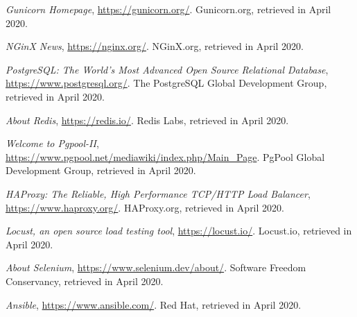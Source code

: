 \documentclass[12pt]{article}
\begin{document}
\begin{thebibliography}{9}
    \textit{Gunicorn Homepage},
    \url{https://gunicorn.org/}.
    Gunicorn.org,
    retrieved in April 2020.
    \vspace{-10pt}

    \textit{NGinX News},
    \url{https://nginx.org/}.
    NGinX.org,
    retrieved in April 2020.
    \vspace{-10pt}

    \textit{PostgreSQL: The World's Most Advanced Open Source Relational Database},
    \url{https://www.postgresql.org/}.
    The PostgreSQL Global Development Group,
    retrieved in April 2020.
    \vspace{-10pt}

    \textit{About Redis},
    \url{https://redis.io/}.
    Redis Labs,
    retrieved in April 2020.
    \vspace{-10pt}

    \textit{Welcome to Pgpool-II},
    \url{https://www.pgpool.net/mediawiki/index.php/Main_Page}.
    PgPool Global Development Group,
    retrieved in April 2020.
    \vspace{-10pt}

    \textit{HAProxy: The Reliable, High Performance TCP/HTTP Load Balancer},
    \url{https://www.haproxy.org/}.
    HAProxy.org,
    retrieved in April 2020.
    \vspace{-10pt}

    \textit{Locust, an open source load testing tool},
    \url{https://locust.io/}.
    Locust.io,
    retrieved in April 2020.
    \vspace{-10pt}

    \textit{About Selenium},
    \url{https://www.selenium.dev/about/}.
    Software Freedom Conservancy,
    retrieved in April 2020.
    \vspace{-10pt}

    \textit{Ansible},
    \url{https://www.ansible.com/}.
    Red Hat,
    retrieved in April 2020.
    
\end{thebibliography}

\clearpage
\end{document}
